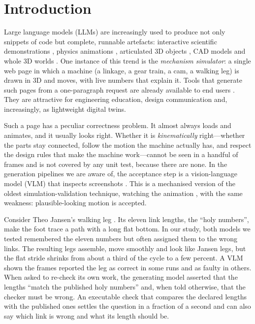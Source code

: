 \section{Introduction}\label{sec:intro}

Large language models (LLMs) are increasingly used to produce not only snippets of code but complete, runnable artefacts: interactive scientific demonstrations \citep{chen2025interactscience}, physics animations \citep{wang2026simuscene,shende2026perceptual}, articulated 3D objects \citep{gao2026lam,le2025articulate}, CAD models \citep{alrashedy2025cad} and whole 3D worlds \citep{lu2026worldcoder}. One instance of this trend is the \emph{mechanism simulator}: a single web page in which a machine (a linkage, a gear train, a cam, a walking leg) is drawn in 3D and moves, with live numbers that explain it. Tools that generate such pages from a one-paragraph request are already available to end users \citep{teardown}. They are attractive for engineering education, design communication and, increasingly, as lightweight digital twins.

Such a page has a peculiar correctness problem. It almost always loads and animates, and it usually looks right. Whether it is \emph{kinematically} right---whether the parts stay connected, follow the motion the machine actually has, and respect the design rules that make the machine work---cannot be seen in a handful of frames and is not covered by any unit test, because there are none. In the generation pipelines we are aware of, the acceptance step is a vision-language model (VLM) that inspects screenshots \citep{shende2026perceptual,le2025articulate,alrashedy2025cad}. This is a mechanised version of the oldest simulation-validation technique, watching the animation \citep{sargent2013vv}, with the same weakness: plausible-looking motion is accepted.

Consider Theo Jansen's walking leg \citep{jansen_strandbeest}. Its eleven link lengths, the ``holy numbers'', make the foot trace a path with a long flat bottom. In our study, both models we tested remembered the eleven numbers but often assigned them to the wrong links. The resulting legs assemble, move smoothly and look like Jansen legs, but the flat stride shrinks from about a third of the cycle to a few percent. A VLM shown the frames reported the leg as correct in some runs and as faulty in others. When asked to re-check its own work, the generating model asserted that the lengths ``match the published holy numbers'' and, when told otherwise, that the checker must be wrong. An executable check that compares the declared lengths with the published ones settles the question in a fraction of a second and can also say which link is wrong and what its length should be.

